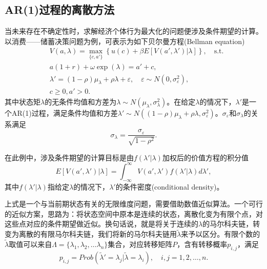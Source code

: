 \begin{subappendices}
\section{AR(1)过程的离散方法}
\label{sec:pj-local-discretization}
当未来存在不确定性时，求解经济个体行为最大化的问题便涉及条件期望的计算。以消费——储蓄决策问题为例，可表示为如下贝尔曼方程(Bellman equation)
\begin{equation}
  \label{sec:pj-local-discrete-cs-problem}
  \begin{split}
    &V(a, \lambda) = \max_{\{c, a' \}} \left\{ u(c) + \beta E\left[ V(a', \lambda') | \lambda \right]\right\}, \quad \text{s.t.}\\
    & a (1+r) + \omega \exp(\lambda) = a' + c, \\
    & \lambda' = (1-\rho) \mu_{\lambda} + \rho \lambda + \varepsilon,\quad \varepsilon \sim N(0,\sigma_{\varepsilon}^2), \\
    & c \ge 0, a' > 0.
  \end{split}
\end{equation}
其中状态矩$\lambda$的无条件均值和方差为$\lambda \sim N(\mu_{\lambda}, \sigma_{\lambda}^2)$。在给定$\lambda$的情况下，$\lambda'$是一个AR(1)过程，满足条件均值和方差$\lambda' \sim N\left( (1-\rho) \mu_{\lambda} + \rho \lambda, \sigma_{\varepsilon}^2 \right)$。$\sigma_{\varepsilon}$和$\sigma_{\lambda}$的关系满足
\begin{equation*}
  \sigma_{\lambda} = \frac{\sigma_{\varepsilon}}{\sqrt{1-\rho^2}}.
\end{equation*}

在此例中，涉及条件期望的计算目标是由$f(\lambda' | \lambda)$加权后的价值方程的积分值
\begin{equation}
  \label{eq:pj-local-discrete-cond-density-def}
  E\left[ V(a', \lambda') | \lambda \right] = \int_{-\infty}^{\infty} V(a',\lambda') f(\lambda' | \lambda) d \lambda',
\end{equation}
其中$f(\lambda' | \lambda)$指给定$\lambda$的情况下，$\lambda'$的条件密度(conditional density)。

上式是一个与当前期状态有关的无限维度问题，需要借助数值近似算法。一个可行的近似方案，思路为：将状态空间中原本是连续的状态，离散化变为有限个点，对这些点对应的条件期望做近似。换句话说，就是将关于连续的$\lambda$的马尔科夫链，转变为离散的有限马尔科夫链，我们将新的马尔科夫链用$\tilde{\lambda}$来予以区分。有限个数的$\tilde{\lambda}$取值可以来自$\Lambda = \{ \lambda_1, \lambda_2, \ldots \lambda_n \}$集合，对应转移矩阵$P$，含有转移概率$p_{i,j}$，满足
\begin{equation*}
  p_{i,j} = Prob \left( \tilde{\lambda}' = \lambda_j | \tilde{\lambda} = \lambda_i \right), \quad i,j=1,2,\ldots,n.
\end{equation*}


\end{subappendices}
